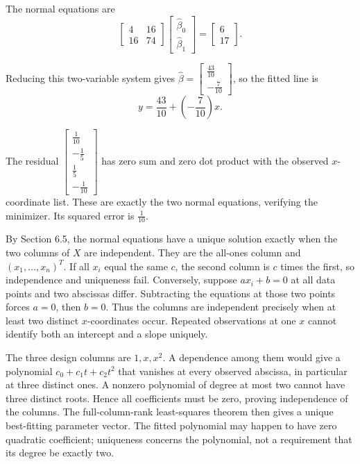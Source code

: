 The normal equations are
\[ \begin{bmatrix}4 & 16\\16 & 74\end{bmatrix}\begin{bmatrix}\widehat\beta_0\\\widehat\beta_1\end{bmatrix}=\begin{bmatrix}6\\17\end{bmatrix}.\]

Reducing this two-variable system gives $\widehat\beta=\begin{bmatrix}\frac{43}{10}\\- \frac{7}{10}\end{bmatrix}$, so the fitted line is
\[ \boxed{y=\frac{43}{10}+(- \frac{7}{10})x}.\]

The residual $\begin{bmatrix}\frac{1}{10}\\- \frac{1}{5}\\\frac{1}{5}\\- \frac{1}{10}\end{bmatrix}$ has zero sum and zero dot product with the observed $x$-coordinate list. These are exactly the two normal equations, verifying the minimizer. Its squared error is $\frac{1}{10}$.


By Section 6.5, the normal equations have a unique solution exactly
when the two columns of $X$ are independent. They are the all-ones
column and $(x_1,\ldots,x_n)^T$.
If all $x_i$ equal the same $c$, the second column is $c$ times
the first, so independence and uniqueness fail. Conversely, suppose
$ax_i+b=0$ at all data points and two abscissas differ. Subtracting
the equations at those two points forces $a=0$, then $b=0$.
Thus the columns are independent precisely when at least two distinct
$x$-coordinates occur. Repeated observations at one $x$ cannot
identify both an intercept and a slope uniquely.

The three design columns are $1,x,x^2$. A dependence among them
would give a polynomial $c_0+c_1t+c_2t^2$ that vanishes at every
observed abscissa, in particular at three distinct ones. A nonzero
polynomial of degree at most two cannot have three distinct roots.
Hence all coefficients must be zero, proving independence of the
columns. The full-column-rank least-squares theorem then gives a
unique best-fitting parameter vector. The fitted polynomial may happen
to have zero quadratic coefficient; uniqueness concerns the polynomial,
not a requirement that its degree be exactly two.

